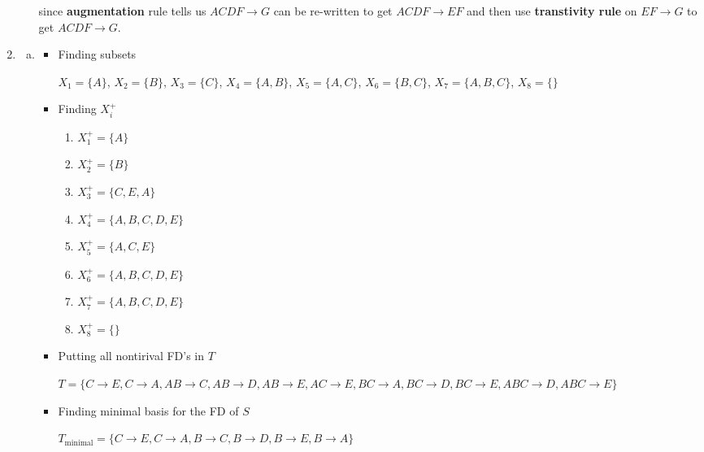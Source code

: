 \documentclass[12pt]{article}
\begin{document}
\begin{enumerate}[1.]
\begin{itemize}
            since \textbf{augmentation} rule tells us $ACDF \to G$ can be
            re-written to get $ACDF \to EF$ and then use \textbf{transtivity rule}
            on $EF \to G$ to get $ACDF \to G$.

        \end{itemize}

    \item

    \begin{enumerate}[a)]
        \item

        \begin{itemize}
            \item Finding subsets

            $X_1 = \{A\}$, $X_2 = \{B\}$, $X_3 = \{C\}$, $X_4 = \{A,B\}$, $X_5 = \{A,C\}$,
            $X_6 = \{B,C\}$, $X_7 = \{A,B,C\}$, $X_8 = \{\}$


            \item Finding $X_i^+$
            \begin{enumerate}[1.]
                \item $X_1^+ = \{A\}$
                \item $X_2^+ = \{B\}$
                \item $X_3^+ = \{C,E,A\}$
                \item $X_4^+ = \{A,B,C,D,E\}$
                \item $X_5^+ = \{A,C,E\}$
                \item $X_6^+ = \{A,B,C,D,E\}$
                \item $X_7^+ = \{A,B,C,D,E\}$
                \item $X_8^+ = \{\}$
            \end{enumerate}

            \item Putting all nontirival FD's in $T$

            $T = \{C \to E, C \to A, AB \to C, AB \to D, AB \to E, AC \to E,
                 BC \to A, BC \to D, BC \to E, ABC \to D, ABC \to E\}$

            \item Finding minimal basis for the FD of $S$


            $T_{\text{minimal}} = \{C \to E, C \to A, B \to C, B \to D, B \to E, B \to A\}$

        \end{itemize}

        \bigskip


\end{enumerate}
\end{enumerate}
\end{document}
